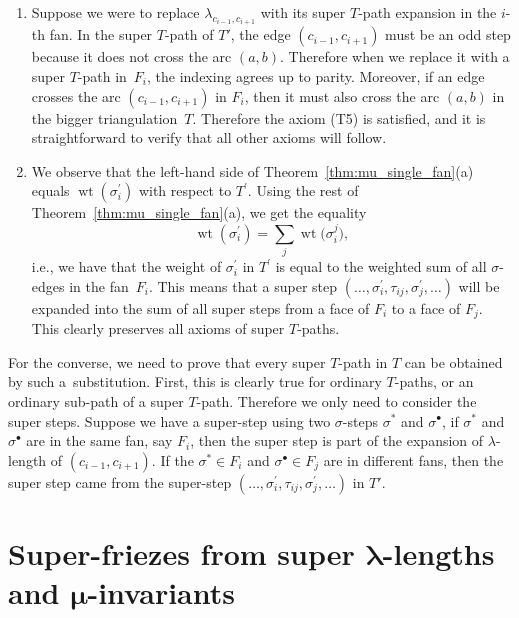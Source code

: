 \documentclass[pdftex]{sigma}
\numberwithin{equation}{section}
\DeclareMathOperator{\wt}{wt}
\begin{document}
\begin{enumerate} \itemsep=0pt
 \item[(1)] Suppose we were to replace $\lambda_{c_{i-1},c_{i+1}}$ with its super $T$-path expansion in the $i$-th fan.
 In the super $T$-path of $T'$, the edge $(c_{i-1},c_{i+1})$ must be an odd step because it does not cross the arc $(a,b)$.
 Therefore when we replace it with a super $T$-path in~$F_i$, the indexing agrees up to parity.
Moreover, if an edge crosses the arc $(c_{i-1},c_{i+1})$ in $F_i$, then it must also cross the arc $(a,b)$ in the bigger triangulation~$T$.
 Therefore the axiom (T5) is satisfied, and it is straightforward to verify that all other axioms will follow.

 \item[(2)] We observe that the left-hand side of Theorem~\ref{thm:mu_single_fan}(a)
 equals $\wt(\sigma_i^\prime)$ with respect to $T^\prime$. Using the rest of Theorem~\ref{thm:mu_single_fan}(a), we get the equality
 \[\wt(\sigma_i^\prime)=\sum_{j}\wt\big(\sigma_i^j\big),\]
 i.e., we have that the weight of $\sigma_i^\prime$ in $T^\prime$ is equal to the weighted sum of all $\sigma$-edges in the fan~$F_i$.
 This means that a super step $(\dots,\sigma_i^\prime,\tau_{ij},\sigma_j^\prime,\dots)$ will be expanded into the sum of all
 super steps from a face of $F_i$ to a face of $F_j$. This clearly preserves all axioms of super $T$-paths.
\end{enumerate}

For the converse, we need to prove that every super $T$-path in $T$ can be obtained by such a~substitution.
First, this is clearly true for ordinary $T$-paths, or an ordinary sub-path of a super $T$-path. Therefore we only need to consider the super steps.
Suppose we have a super-step using two $\sigma$-steps $\sigma^*$ and $\sigma^\bullet$, if $\sigma^*$ and $\sigma^\bullet$ are in the same fan,
say $F_i$, then the super step is part of the expansion of $\lambda$-length of $(c_{i-1},c_{i+1})$.
If the $\sigma^*\in F_i$ and $\sigma^\bullet\in F_j$ are in different fans, then the super step came from the super-step
$(\dots,\sigma_i^\prime,\tau_{ij},\sigma_j^\prime,\dots)$ in $T'$.

\section[Super-friezes from super lambda-lengths and mu-invariants]{Super-friezes from super $\boldsymbol{\lambda}$-lengths and $\boldsymbol{\mu}$-invariants}\label{sec:super-friezes}
\end{document}
